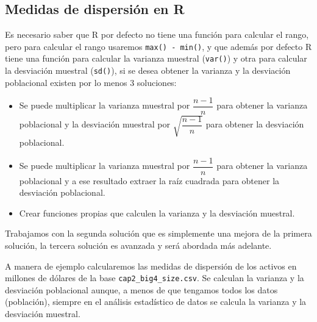 \documentclass[letterpaper,]{book}
\providecommand{\tightlist}{%
  \setlength{\itemsep}{0pt}\setlength{\parskip}{0pt}}
\begin{document}
\hypertarget{medidas-de-dispersion-en-r}{%
\subsection{Medidas de dispersión en R}\label{medidas-de-dispersion-en-r}}

Es necesario saber que R por defecto no tiene una función para calcular el rango, pero para calcular el rango usaremos \texttt{max()\ -\ min()}, y que además por defecto R tiene una función para calcular la varianza muestral (\texttt{var()}) y otra para calcular la desviación muestral (\texttt{sd()}), si se desea obtener la varianza y la desviación poblacional existen por lo menos 3 soluciones:

\begin{itemize}
\tightlist
\item
  Se puede multiplicar la varianza muestral por \(\dfrac{n-1}{n}\) para obtener la varianza poblacional y la desviación muestral por \(\sqrt{\dfrac{n-1}{n}}\) para obtener la desviación poblacional.
\item
  Se puede multiplicar la varianza muestral por \(\dfrac{n-1}{n}\) para obtener la varianza poblacional y a ese resultado extraer la raíz cuadrada para obtener la desviación poblacional.
\item
  Crear funciones propias que calculen la varianza y la desviación muestral.
\end{itemize}

Trabajamos con la segunda solución que es simplemente una mejora de la primera solución, la tercera solución es avanzada y será abordada más adelante.

A manera de ejemplo calcularemos las medidas de dispersión de los activos en millones de dólares de la base \texttt{cap2\_big4\_size.csv}. Se calculan la varianza y la desviación poblacional aunque, a menos de que tengamos todos los datos (población), siempre en el análisis estadístico de datos se calcula la varianza y la desviación muestral.
\end{document}
